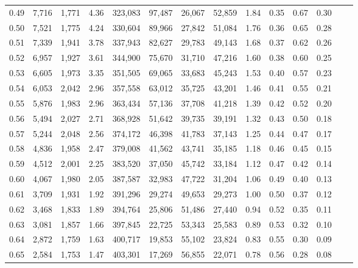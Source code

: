 \begin{tabular}{rrrrrrrrrrrrrr}
0.49 &   7,716 &  1,771 &    4.36 &  323,083 &   97,487 &  26,067 &  52,859 &  1.84 &  0.35 &  0.67 &      0.30 \\
0.50 &   7,521 &  1,775 &    4.24 &  330,604 &   89,966 &  27,842 &  51,084 &  1.76 &  0.36 &  0.65 &      0.28 \\
0.51 &   7,339 &  1,941 &    3.78 &  337,943 &   82,627 &  29,783 &  49,143 &  1.68 &  0.37 &  0.62 &      0.26 \\
0.52 &   6,957 &  1,927 &    3.61 &  344,900 &   75,670 &  31,710 &  47,216 &  1.60 &  0.38 &  0.60 &      0.25 \\
0.53 &   6,605 &  1,973 &    3.35 &  351,505 &   69,065 &  33,683 &  45,243 &  1.53 &  0.40 &  0.57 &      0.23 \\
0.54 &   6,053 &  2,042 &    2.96 &  357,558 &   63,012 &  35,725 &  43,201 &  1.46 &  0.41 &  0.55 &      0.21 \\
0.55 &   5,876 &  1,983 &    2.96 &  363,434 &   57,136 &  37,708 &  41,218 &  1.39 &  0.42 &  0.52 &      0.20 \\
0.56 &   5,494 &  2,027 &    2.71 &  368,928 &   51,642 &  39,735 &  39,191 &  1.32 &  0.43 &  0.50 &      0.18 \\
0.57 &   5,244 &  2,048 &    2.56 &  374,172 &   46,398 &  41,783 &  37,143 &  1.25 &  0.44 &  0.47 &      0.17 \\
0.58 &   4,836 &  1,958 &    2.47 &  379,008 &   41,562 &  43,741 &  35,185 &  1.18 &  0.46 &  0.45 &      0.15 \\
0.59 &   4,512 &  2,001 &    2.25 &  383,520 &   37,050 &  45,742 &  33,184 &  1.12 &  0.47 &  0.42 &      0.14 \\
0.60 &   4,067 &  1,980 &    2.05 &  387,587 &   32,983 &  47,722 &  31,204 &  1.06 &  0.49 &  0.40 &      0.13 \\
0.61 &   3,709 &  1,931 &    1.92 &  391,296 &   29,274 &  49,653 &  29,273 &  1.00 &  0.50 &  0.37 &      0.12 \\
0.62 &   3,468 &  1,833 &    1.89 &  394,764 &   25,806 &  51,486 &  27,440 &  0.94 &  0.52 &  0.35 &      0.11 \\
0.63 &   3,081 &  1,857 &    1.66 &  397,845 &   22,725 &  53,343 &  25,583 &  0.89 &  0.53 &  0.32 &      0.10 \\
0.64 &   2,872 &  1,759 &    1.63 &  400,717 &   19,853 &  55,102 &  23,824 &  0.83 &  0.55 &  0.30 &      0.09 \\
0.65 &   2,584 &  1,753 &    1.47 &  403,301 &   17,269 &  56,855 &  22,071 &  0.78 &  0.56 &  0.28 &      0.08 \\

\end{tabular}
